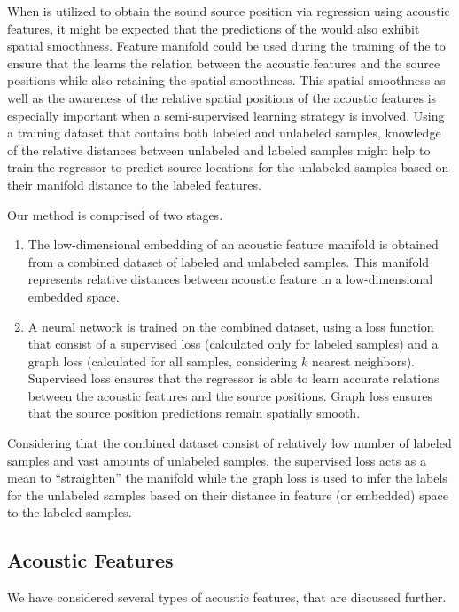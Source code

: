 \documentclass[applsci,article,submit,moreauthors,pdftex]{Definitions/mdpi}
\begin{document}
When \ann{} is utilized to obtain the sound source position via regression using acoustic features, it might be expected that the predictions of the \ann{} would also exhibit spatial smoothness. Feature manifold could be used during the training of the \ann{} to ensure that the \ann{} learns the relation between the acoustic features and the source positions while also retaining the spatial smoothness.
This spatial smoothness as well as the awareness of the relative spatial positions of the acoustic features is especially important when a semi-supervised learning strategy is involved. Using a training dataset that contains both labeled and unlabeled samples, knowledge of the relative distances between unlabeled and labeled samples might help to train the regressor to predict source locations for the unlabeled samples based on their manifold distance to the labeled features.


Our method is comprised of two stages.
\begin{enumerate}
	\item The low-dimensional embedding of an acoustic feature manifold is obtained from a combined dataset of labeled and unlabeled samples. This manifold represents relative distances between acoustic feature in a low-dimensional embedded space.
	\item A neural network is trained on the combined dataset, using a loss function that consist  of a supervised loss (calculated only for labeled samples) and a graph loss (calculated for all samples, considering $ k $ nearest neighbors). Supervised loss ensures that the regressor is able to learn accurate relations between the acoustic features and the source positions. Graph loss ensures that the source position predictions remain spatially smooth.
\end{enumerate}

Considering that the combined dataset consist of relatively low number of labeled samples and vast amounts of unlabeled samples, the supervised loss acts as a mean to ``straighten'' the manifold while the graph loss is used to infer the labels for the unlabeled samples based on their distance in feature (or embedded) space to the labeled samples.


\subsection{Acoustic Features}
We have considered several types of acoustic features, that are discussed further.
\end{document}
